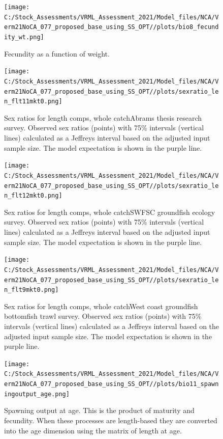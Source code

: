 \documentclass[
  english,
  a4paper,
]{article}
\begin{document}
\begin{figure}
\centering
\texttt{[image: C:/Stock\_Assessments/VRML\_Assessment\_2021/Model\_files/NCA/Verm21NoCA\_077\_proposed\_base\_using\_SS\_OPT//plots/bio8\_fecundity\_wt.png]}
\caption{Fecundity as a function of weight.\label{fig:fecundity}}
\end{figure}

\begin{figure}
\centering
\texttt{[image: C:/Stock\_Assessments/VRML\_Assessment\_2021/Model\_files/NCA/Verm21NoCA\_077\_proposed\_base\_using\_SS\_OPT//plots/sexratio\_len\_flt11mkt0.png]}
\caption{Sex ratios for length comps, whole catchAbrams thesis research survey. Observed sex ratios (points) with 75\% intervals (vertical lines) calculated as a Jeffreys interval based on the adjusted input sample size. The model expectation is shown in the purple line.\label{fig:sexratio-ABRAMS-RESEARCH}}
\end{figure}

\begin{figure}
\centering
\texttt{[image: C:/Stock\_Assessments/VRML\_Assessment\_2021/Model\_files/NCA/Verm21NoCA\_077\_proposed\_base\_using\_SS\_OPT//plots/sexratio\_len\_flt12mkt0.png]}
\caption{Sex ratios for length comps, whole catchSWFSC groundfish ecology survey. Observed sex ratios (points) with 75\% intervals (vertical lines) calculated as a Jeffreys interval based on the adjusted input sample size. The model expectation is shown in the purple line.\label{fig:sexratio-SWFSC-GF-ECOL}}
\end{figure}

\begin{figure}
\centering
\texttt{[image: C:/Stock\_Assessments/VRML\_Assessment\_2021/Model\_files/NCA/Verm21NoCA\_077\_proposed\_base\_using\_SS\_OPT//plots/sexratio\_len\_flt9mkt0.png]}
\caption{Sex ratios for length comps, whole catchWest coast groundfish bottomfish trawl survey. Observed sex ratios (points) with 75\% intervals (vertical lines) calculated as a Jeffreys interval based on the adjusted input sample size. The model expectation is shown in the purple line.\label{fig:sexratio-NWFSC-TWL}}
\end{figure}

\begin{figure}
\centering
\texttt{[image: C:/Stock\_Assessments/VRML\_Assessment\_2021/Model\_files/NCA/Verm21NoCA\_077\_proposed\_base\_using\_SS\_OPT//plots/bio11\_spawningoutput\_age.png]}
\caption{Spawning output at age. This is the product of maturity and fecundity. When these processes are length-based they are converted into the age dimension using the matrix of length at age.\label{fig:spawningoutputage}}
\end{figure}
\end{document}
